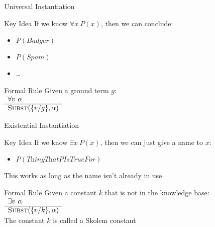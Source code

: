 \documentclass[14pt]{beamer}
\begin{document}
\begin{frame}{Universal Instantiation}
	\begin{block}{Key Idea}
		If we know $\forall x\ P(x)$, then we can conclude: \\
		\begin{itemize}
			\item $P(\textit{Badger})$
			\item $P(\textit{Spam})$
			\item \ldots
		\end{itemize}
	\end{block}
	\pause
	\begin{block}{Formal Rule}
		Given a ground term $g$: \\[.5em]
		$
		\begin{array}{l}
		\forall v\ \alpha \\
		\hline
		\textsc{Subst}(\{v/g\}, \alpha)
		\end{array}
		$
	\end{block}
\end{frame}

\begin{frame}{Existential Instantiation}
	\begin{block}{Key Idea}
		If we know $\exists x\ P(x)$, then we can just give a name to $x$: \\
		\begin{itemize}
			\item $P(\textit{ThingThatPIsTrueFor})$
		\end{itemize}
		This works as long as the name isn't already in use
	\end{block}
	\pause
	\begin{block}{Formal Rule}
		Given a constant $k$ that is not in the knowledge base: \\[.5em]
		$
		\begin{array}{l}
		\exists v\ \alpha \\
		\hline
		\textsc{Subst}(\{v/k\}, \alpha)
		\end{array}
		$ \\[.5em]
		The constant $k$ is called a \alert{Skolem constant}
	\end{block}
\end{frame}
\end{document}
